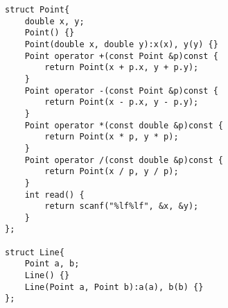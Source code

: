 \begin{lstlisting}
struct Point{
	double x, y;
	Point() {}
	Point(double x, double y):x(x), y(y) {}
	Point operator +(const Point &p)const {
		return Point(x + p.x, y + p.y);
	}
	Point operator -(const Point &p)const {
		return Point(x - p.x, y - p.y);
	}
	Point operator *(const double &p)const {
		return Point(x * p, y * p);
	}
	Point operator /(const double &p)const {
		return Point(x / p, y / p);
	}
	int read() {
		return scanf("%lf%lf", &x, &y);
	}
};

struct Line{
	Point a, b;
	Line() {}
	Line(Point a, Point b):a(a), b(b) {}
};
\end{lstlisting}
